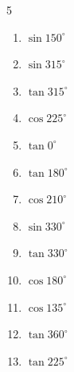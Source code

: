 \begin{multicols}{5}
\begin{enumerate}
  \item $\displaystyle \sin{150^\circ}$


  \item $\displaystyle \sin{315^\circ}$


  \item $\displaystyle \tan{315^\circ}$

        \phantom{$\displaystyle =-1$}

  \item $\displaystyle \cos{225^\circ}$


  \item $\displaystyle \tan{0^\circ}$

        \phantom{$\displaystyle =0$}

  \item $\displaystyle \tan{180^\circ}$

        \phantom{$\displaystyle =0$}

  \item $\displaystyle \cos{210^\circ}$


  \item $\displaystyle \sin{330^\circ}$


  \item $\displaystyle \tan{330^\circ}$


\columnbreak %

  \item $\displaystyle \cos{180^\circ}$

        \phantom{$\displaystyle =-1$}

  \item $\displaystyle \cos{135^\circ}$


  \item $\displaystyle \tan{360^\circ}$

        \phantom{$\displaystyle =0$}

  \item $\displaystyle \tan{225^\circ}$


\end{enumerate}
\end{multicols}
